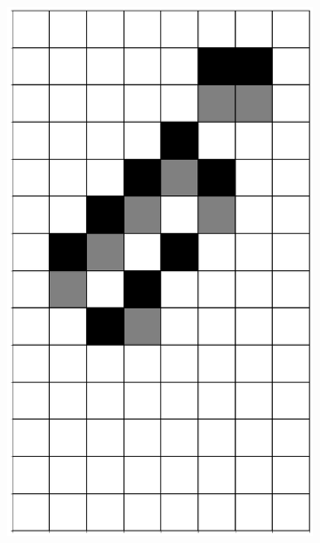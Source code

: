 \documentclass[12pt]{article}
\numberwithin{figure}{section} %
\begin{document}
\begin{figure}[H]
\begin{subfigure}{0.18\textwidth}
     		\includegraphics[width=\linewidth]{Section4/17.4}
     		\subcaption{}
   	\end{subfigure}
      	\newline
   	\setcounter{subfigure}{0}
\end{figure}
   
\end{document}
